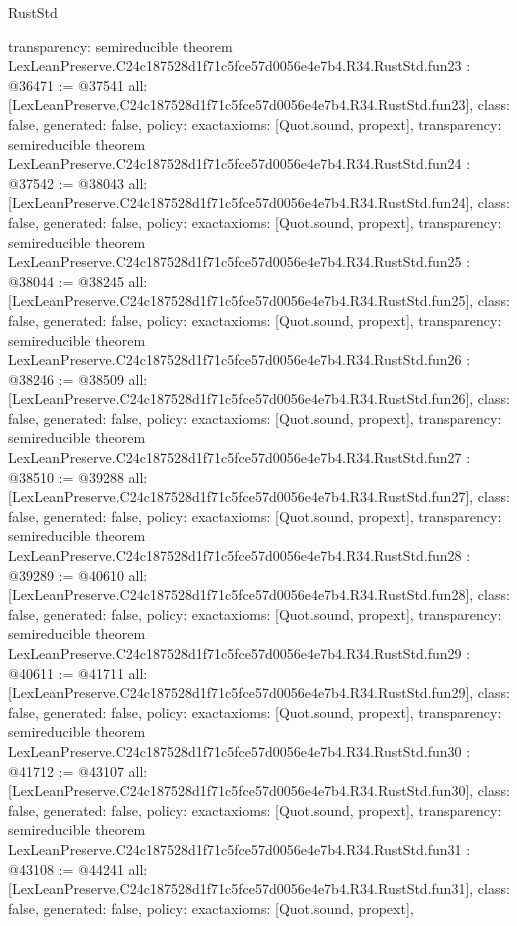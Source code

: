 \begin{lexlean}{RustStd}
\begin{coremodule}
{  transparency: semireducible
}
theorem LexLeanPreserve.C24c187528d1f71c5fce57d0056e4e7b4.R34.RustStd.fun23 : @36471 := @37541 {
  all: [LexLeanPreserve.C24c187528d1f71c5fce57d0056e4e7b4.R34.RustStd.fun23],
  class: false,
  generated: false,
  policy: exact{axioms: [Quot.sound, propext]},
  transparency: semireducible
}
theorem LexLeanPreserve.C24c187528d1f71c5fce57d0056e4e7b4.R34.RustStd.fun24 : @37542 := @38043 {
  all: [LexLeanPreserve.C24c187528d1f71c5fce57d0056e4e7b4.R34.RustStd.fun24],
  class: false,
  generated: false,
  policy: exact{axioms: [Quot.sound, propext]},
  transparency: semireducible
}
theorem LexLeanPreserve.C24c187528d1f71c5fce57d0056e4e7b4.R34.RustStd.fun25 : @38044 := @38245 {
  all: [LexLeanPreserve.C24c187528d1f71c5fce57d0056e4e7b4.R34.RustStd.fun25],
  class: false,
  generated: false,
  policy: exact{axioms: [Quot.sound, propext]},
  transparency: semireducible
}
theorem LexLeanPreserve.C24c187528d1f71c5fce57d0056e4e7b4.R34.RustStd.fun26 : @38246 := @38509 {
  all: [LexLeanPreserve.C24c187528d1f71c5fce57d0056e4e7b4.R34.RustStd.fun26],
  class: false,
  generated: false,
  policy: exact{axioms: [Quot.sound, propext]},
  transparency: semireducible
}
theorem LexLeanPreserve.C24c187528d1f71c5fce57d0056e4e7b4.R34.RustStd.fun27 : @38510 := @39288 {
  all: [LexLeanPreserve.C24c187528d1f71c5fce57d0056e4e7b4.R34.RustStd.fun27],
  class: false,
  generated: false,
  policy: exact{axioms: [Quot.sound, propext]},
  transparency: semireducible
}
theorem LexLeanPreserve.C24c187528d1f71c5fce57d0056e4e7b4.R34.RustStd.fun28 : @39289 := @40610 {
  all: [LexLeanPreserve.C24c187528d1f71c5fce57d0056e4e7b4.R34.RustStd.fun28],
  class: false,
  generated: false,
  policy: exact{axioms: [Quot.sound, propext]},
  transparency: semireducible
}
theorem LexLeanPreserve.C24c187528d1f71c5fce57d0056e4e7b4.R34.RustStd.fun29 : @40611 := @41711 {
  all: [LexLeanPreserve.C24c187528d1f71c5fce57d0056e4e7b4.R34.RustStd.fun29],
  class: false,
  generated: false,
  policy: exact{axioms: [Quot.sound, propext]},
  transparency: semireducible
}
theorem LexLeanPreserve.C24c187528d1f71c5fce57d0056e4e7b4.R34.RustStd.fun30 : @41712 := @43107 {
  all: [LexLeanPreserve.C24c187528d1f71c5fce57d0056e4e7b4.R34.RustStd.fun30],
  class: false,
  generated: false,
  policy: exact{axioms: [Quot.sound, propext]},
  transparency: semireducible
}
theorem LexLeanPreserve.C24c187528d1f71c5fce57d0056e4e7b4.R34.RustStd.fun31 : @43108 := @44241 {
  all: [LexLeanPreserve.C24c187528d1f71c5fce57d0056e4e7b4.R34.RustStd.fun31],
  class: false,
  generated: false,
  policy: exact{axioms: [Quot.sound, propext]},
}
\end{coremodule}
\end{lexlean}
